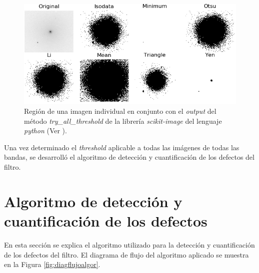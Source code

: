 \begin{enumerate}
\begin{figure}[H]
	\centering
	\includegraphics[scale=0.8]{Figs/defectosZEISS/thresh_vivos_compar3.png}
	\caption{Región de una imagen individual en conjunto con el \textit{output} del método \textit{try\_all\_threshold} de la librería \textit{scikit-image} del lenguaje \textit{python} (Ver \href{https://github.com/jrr1984/defects_analysis/blob/master/try_all_thresholds.py}{\faGithub}).} 
	\label{fig:threshcom2}
\end{figure}
\end{enumerate}


\hspace{0.5cm}Una vez determinado el \textit{threshold} aplicable a todas las imágenes de todas las bandas, se desarrolló el algoritmo de detección y cuantificación de los defectos del filtro.

\singlespacing
\section{Algoritmo de detección y cuantificación de los defectos \href{https://github.com/jrr1984/defects_analysis/blob/master/defects_thresholding.py}{\faGithub}}
\label{sec:secalg}

\hspace{0.5cm}En esta sección se explica el algoritmo utilizado para la detección y cuantificación de los defectos del filtro. El diagrama de flujo del algoritmo aplicado se muestra en la Figura \ref{fig:diagflujoalgor}. 

